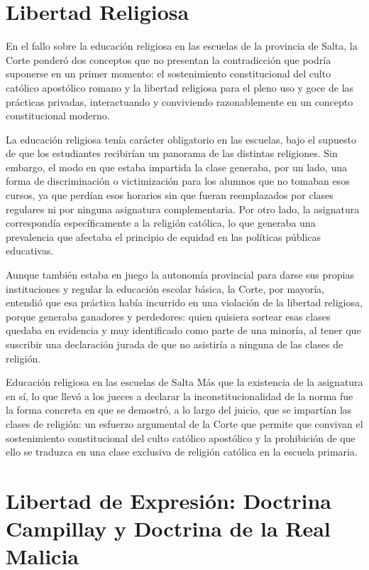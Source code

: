 \documentclass[12pt,oneside]{book}
\begin{document}
\section{Libertad Religiosa}

En el fallo sobre la educación religiosa en las escuelas de la provincia de Salta, la Corte ponderó dos conceptos que no presentan la contradicción que podría suponerse en un primer momento: el sostenimiento constitucional del culto católico apostólico romano y la libertad religiosa para el pleno uso y goce de las prácticas privadas, interactuando y conviviendo razonablemente en un concepto constitucional moderno.

La educación religiosa tenía carácter obligatorio en las escuelas, bajo el supuesto de que los estudiantes recibirían un panorama de las distintas religiones. Sin embargo, el modo en que estaba impartida la clase generaba, por un lado, una forma de discriminación o victimización para los alumnos que no tomaban esos cursos, ya que perdían esos horarios sin que fueran reemplazados por clases regulares ni por ninguna asignatura complementaria. Por otro lado, la asignatura correspondía específicamente a la religión católica, lo que generaba una prevalencia que afectaba el principio de equidad en las políticas públicas educativas.

Aunque también estaba en juego la autonomía provincial para darse sus propias instituciones y regular la educación escolar básica, la Corte, por mayoría, entendió que esa práctica había incurrido en una violación de la libertad religiosa, porque generaba ganadores y perdedores: quien quisiera sortear esas clases quedaba en evidencia y muy identificado como parte de una minoría, al tener que suscribir una declaración jurada de que no asistiría a ninguna de las clases de religión.

\begin{example}{Educación religiosa en las escuelas de Salta}
Más que la existencia de la asignatura en sí, lo que llevó a los jueces a declarar la inconstitucionalidad de la norma fue la forma concreta en que se demostró, a lo largo del juicio, que se impartían las clases de religión: un esfuerzo argumental de la Corte que permite que convivan el sostenimiento constitucional del culto católico apostólico y la prohibición de que ello se traduzca en una clase exclusiva de religión católica en la escuela primaria.
\end{example}

\section{Libertad de Expresión: Doctrina Campillay y Doctrina de la Real Malicia}
\end{document}
